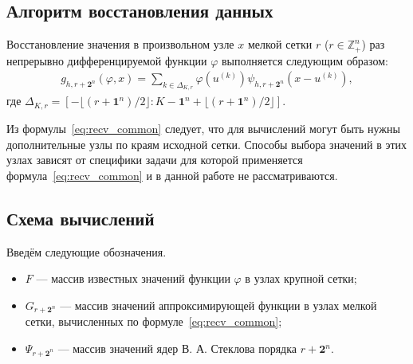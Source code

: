 
\label{sec:func_recv}

\subsection*{Алгоритм восстановления данных}

Восстановление значения в произвольном  узле $x$    мелкой сетки %
$r$ ($r\in\mathbb{Z}_+^n$) раз непрерывно дифференцируемой функции $\varphi$
выполняется следующим образом: 
\begin{gather}
  \label{eq:recv_common}
  g_{h,r+\mathbf{2}^n}(\varphi, x) = \sum_{k\in  \Delta_{K,r}}
   \varphi(u^{(k)})
   \psi_{h, r+\mathbf{2}^n}(x-u^{(k)}),%
 \end{gather}
 где $ \Delta_{K,r}=\left[-\lfloor{(r+\mathbf{1}^n)/2}\rfloor:
   K-\mathbf{1}^n+\lfloor{(r+\mathbf{1}^n)/2}\rfloor\right]$.  %

 
Из формулы~\eqref{eq:recv_common} следует, что для вычислений
могут быть нужны дополнительные
узлы по краям исходной сетки.
Способы выбора значений в этих узлах зависят
от специфики задачи для которой применяется формула~\eqref{eq:recv_common}  
и в данной работе не рассматриваются.


\subsection*{Схема вычислений}


Введём  следующие обозначения.
\begin{itemize}

\item
  $F$  --- массив  известных значений функции $\varphi$
  в узлах крупной сетки;

\item
  $G_{r+\mathbf{2}^n}$ --- массив
  значений аппроксимирующей функции в узлах мелкой сетки,
  вычисленных по формуле~\eqref{eq:recv_common};

\item
  $\Psi_{r+\mathbf{2}^n}$ --- массив  значений ядер В. А. Стеклова порядка $r+\mathbf{2}^n$.

\end{itemize}


